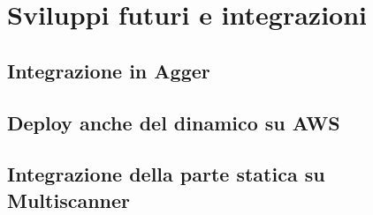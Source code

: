 \chapter{Sviluppi futuri e integrazioni}

\section{Integrazione in Agger}

\section{Deploy anche del dinamico su AWS}

\section{Integrazione della parte statica su Multiscanner}